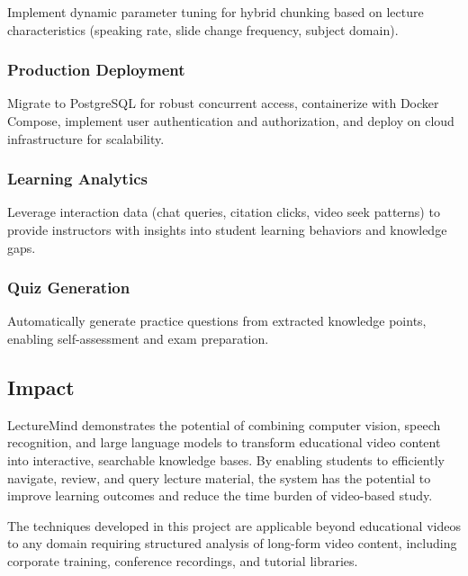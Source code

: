 \documentclass[12pt,a4paper]{article}
\begin{document}
Implement dynamic parameter tuning for hybrid chunking based on lecture characteristics (speaking rate, slide change frequency, subject domain).

\subsubsection{Production Deployment}

Migrate to PostgreSQL for robust concurrent access, containerize with Docker Compose, implement user authentication and authorization, and deploy on cloud infrastructure for scalability.

\subsubsection{Learning Analytics}

Leverage interaction data (chat queries, citation clicks, video seek patterns) to provide instructors with insights into student learning behaviors and knowledge gaps.

\subsubsection{Quiz Generation}

Automatically generate practice questions from extracted knowledge points, enabling self-assessment and exam preparation.

\subsection{Impact}

LectureMind demonstrates the potential of combining computer vision, speech recognition, and large language models to transform educational video content into interactive, searchable knowledge bases. By enabling students to efficiently navigate, review, and query lecture material, the system has the potential to improve learning outcomes and reduce the time burden of video-based study.

The techniques developed in this project are applicable beyond educational videos to any domain requiring structured analysis of long-form video content, including corporate training, conference recordings, and tutorial libraries.

\newpage
\end{document}
